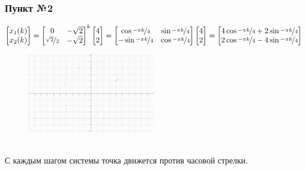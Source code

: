 \documentclass[a3paper,14pt]{extarticle}
\begin{document}
\subsubsection*{Пункт №2}
$$\begin{bmatrix}
    x_1(k) \\ x_2(k)
\end{bmatrix} = \begin{bmatrix}
    0 & -\sqrt{2} \\ \nicefrac{\sqrt{2}}{2} & -\sqrt{2}
\end{bmatrix}^k\begin{bmatrix}
    4 \\ 2
\end{bmatrix} = \begin{bmatrix}
    \cos{\nicefrac{-\pi k}{4}} & \sin{\nicefrac{-\pi k}{4}} \\
    -\sin{\nicefrac{-\pi k}{4}} & \cos{\nicefrac{-\pi k}{4}}
\end{bmatrix}\begin{bmatrix}
    4 \\ 2
\end{bmatrix} = \begin{bmatrix}
    4\cos{\nicefrac{-\pi k}{4}}+2\sin{\nicefrac{-\pi k}{4}} \\
    2\cos{\nicefrac{-\pi k}{4}}-4\sin{\nicefrac{-\pi k}{4}}
\end{bmatrix}$$
\begin{figure}[h]
    \centering\includegraphics[width=0.5\textwidth]{4.2.png}
\end{figure} \\
С каждым шагом системы точка движется против часовой стрелки.\\[3em]
\end{document}
